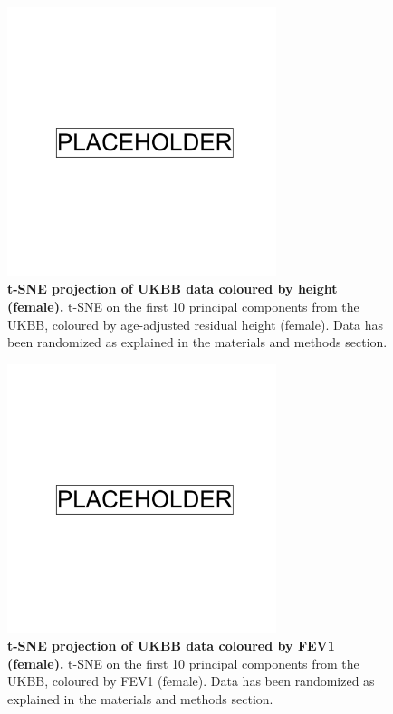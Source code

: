 \clearpage
\begin{figure}[ht]
    \centering
    \includegraphics[width=0.7\textwidth]{placeholder.png}
    \caption[t-SNE projection of UKBB data coloured by height (female)]{\textbf{t-SNE projection of UKBB data coloured by height (female).} t-SNE on the first 10 principal components from the UKBB, coloured by age-adjusted residual height (female). Data has been randomized as explained in the materials and methods section.}
    \label{fig:supp_ukbb_tsne_height_res_f}
\end{figure}

\newpage

\begin{figure}[ht]
    \centering
    \includegraphics[width=0.7\textwidth]{placeholder.png}
    \caption[t-SNE projection of UKBB data coloured by FEV1 (female)]{\textbf{t-SNE projection of UKBB data coloured by FEV1 (female).} t-SNE on the first 10 principal components from the UKBB, coloured by FEV1 (female). Data has been randomized as explained in the materials and methods section.}
    \label{fig:supp_ukbb_tsne_fev_f}
\end{figure}

